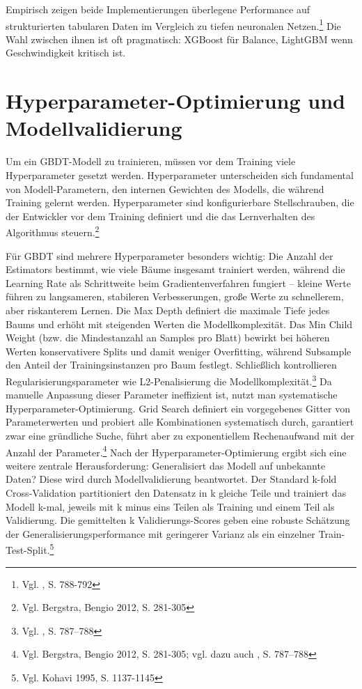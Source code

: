 Empirisch zeigen beide Implementierungen überlegene Performance auf strukturierten tabularen Daten im Vergleich zu tiefen neuronalen Netzen.\footnote{Vgl. \cite{Chen2016}, S. 788-792} Die Wahl zwischen ihnen ist oft pragmatisch: XGBoost für Balance, LightGBM wenn Geschwindigkeit kritisch ist.



\section{Hyperparameter-Optimierung und Modellvalidierung}

Um ein GBDT-Modell zu trainieren, müssen vor dem Training viele Hyperparameter gesetzt werden. Hyperparameter unterscheiden sich fundamental von Modell-Parametern, den internen Gewichten des Modells, die während Training gelernt werden. Hyperparameter sind konfigurierbare Stellschrauben, die der Entwickler vor dem Training definiert und die das Lernverhalten des Algorithmus steuern.\footnote{Vgl. Bergstra, Bengio 2012, S. 281-305}

Für GBDT sind mehrere Hyperparameter besonders wichtig: Die Anzahl der Estimators bestimmt, wie viele Bäume insgesamt trainiert werden, während die Learning Rate als Schrittweite beim Gradientenverfahren fungiert – kleine Werte führen zu langsameren, stabileren Verbesserungen, große Werte zu schnellerem, aber riskanterem Lernen. Die Max Depth definiert die maximale Tiefe jedes Baums und erhöht mit steigenden Werten die Modellkomplexität. Das Min Child Weight (bzw. die Mindestanzahl an Samples pro Blatt) bewirkt bei höheren Werten konservativere Splits und damit weniger Overfitting, während Subsample den Anteil der Trainingsinstanzen pro Baum festlegt. Schließlich kontrollieren Regularisierungsparameter wie L2-Penalisierung die Modellkomplexität.\footnote{Vgl. \cite{Chen2016}, S. 787–788}
Da manuelle Anpassung dieser Parameter ineffizient ist, nutzt man systematische Hyperparameter-Optimierung. Grid Search definiert ein vorgegebenes Gitter von Parameterwerten und probiert alle Kombinationen systematisch durch, garantiert zwar eine gründliche Suche, führt aber zu exponentiellem Rechenaufwand mit der Anzahl der Parameter.\footnote{Vgl. Bergstra, Bengio 2012, S. 281-305; vgl. dazu auch \cite{Chen2016}, S. 787–788}
Nach der Hyperparameter-Optimierung ergibt sich eine weitere zentrale Herausforderung: Generalisiert das Modell auf unbekannte Daten? Diese wird durch Modellvalidierung beantwortet. Der Standard k-fold Cross-Validation partitioniert den Datensatz in k gleiche Teile und trainiert das Modell k-mal, jeweils mit k minus eins Teilen als Training und einem Teil als Validierung. Die gemittelten k Validierungs-Scores geben eine robuste Schätzung der Generalisierungsperformance mit geringerer Varianz als ein einzelner Train-Test-Split.\footnote{Vgl. Kohavi 1995, S. 1137-1145}

